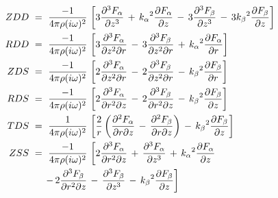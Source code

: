 \documentclass{article}
\begin{document}
\begin{align*}
ZDD \   &= \  { \frac{-1 }{ { 4 \pi \rho ( i \omega )^2 } }} \, \left[ 3 { \frac{ \partial^3 F_{\alpha}   }{  \partial {\it z}^3 } } \,+\, {{ k_{\alpha} }}^2 { \frac{ \partial F_{\alpha}   }{  \partial {\it z} } } \,-\, 3 { \frac{ \partial^3 F_{\beta}   }{  \partial {\it z}^3 } } \,-\, 3 {{ k_{\beta} }}^2 { \frac{ \partial F_{\beta}   }{  \partial {\it z} } } \right] \, \\
RDD \   &= \  { \frac{-1 }{ { 4 \pi \rho ( i \omega )^2 } }} \, \left[ 3 { \frac{ \partial^3 F_{\alpha}   }{  \partial {\it z}^2 \partial r } } \,-\, 3 { \frac{ \partial^3 F_{\beta}   }{  \partial {\it z}^2 \partial r } } \,+\, {{ k_{\alpha} }}^2 { \frac{ \partial F_{\alpha}   }{  \partial r } } \right] \, \\
ZDS \   &= \  { \frac{-1 }{ { 4 \pi \rho ( i \omega )^2 } }}  \, \left[ 2 { \frac{ \partial^3 F_{\alpha}   }{  \partial {\it z}^2 \partial r } } \,-\,2 { \frac{ \partial^3 F_{\beta}   }{  \partial {\it z}^2 \partial r } } \,-\, {{ k_{\beta} }}^2 { \frac{ \partial F_{\beta}   }{  \partial r } } \right] \, \\
RDS \   &= \  { \frac{-1 }{ { 4 \pi \rho ( i \omega )^2 } }} \, \left[ 2 { \frac{ \partial^3 F_{\alpha}   }{  \partial r^2 \partial {\it z} } } \,-\,2 { \frac{ \partial^3 F_{\beta}   }{  \partial r^2 \partial {\it z} } } \,-\, {{ k_{\beta} }}^2 { \frac{ \partial F_{\beta}   }{  \partial {\it z} } } \right] \, \\
TDS \   &= \   { \frac{1 }{ { 4 \pi \rho ( i \omega )^2 } }} \, \left[ \frac{2 }{ r }\left( { \frac{ \partial^2 F_{\alpha}   }{  \partial r \partial {\it z} } } \,-\, { \frac{ \partial^2 F_{\beta}   }{  \partial r \partial {\it z} } } \right) \,-\, {{ k_{\beta} }}^2 { \frac{ \partial F_{\beta}   }{  \partial {\it z} } } \right] \, \\
ZSS \   &= \   { \frac{-1 }{ { 4 \pi \rho ( i \omega )^2 } }} \, \left[ 2 { \frac{ \partial^3 F_{\alpha}   }{  \partial r^2 \partial {\it z} } } \,+\, { \frac{ \partial^3 F_{\alpha}   }{  \partial {\it z}^3 } } \,+\, {{ k_{\alpha} }}^2 { \frac{ \partial F_{\alpha}   }{  \partial {\it z} } }  \right . \\
& \left.  \ \ \ \,-\, 2 { \frac{ \partial^3 F_{\beta}   }{  \partial r^2 \partial {\it z} } } \,-\, { \frac{ \partial^3 F_{\beta}   }{  \partial {\it z}^3 } } \,-\, {{ k_{\beta} }}^2 { \frac{ \partial F_{\beta}   }{  \partial {\it z} } } \right] \, \\

\end{align*}
\end{document}
